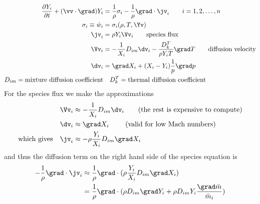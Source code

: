 \documentclass[10pt]{article}
\begin{document}
\begin{align*}
  {\partial Y_i \over \partial t} + (\vv\cdot\grad) Y_i & = {1\over\rho}\sigma_i
              - {1\over\rho}\grad\cdot \jv_i \qquad i=1,2,\ldots,n \\
   \sigma_i \equiv \dot{w}_i &= \sigma_i(\rho,T,\Yv)   \\
      \jv_i & = \rho Y_i \Vv_i \qquad\mbox{species flux} \\
      \Vv_i &= - {1\over X_i} D_{im} \dv_i - {D_k^T\over \rho Y_i T} \grad T \qquad\mbox{diffusion velocity} \\
      \dv_i &= \grad X_i + (X_i-Y_i) {1\over p} \grad p    \\
      D_{im} = \mbox{mixture diffusion coefficient} & \quad D_k^T = \mbox{thermal diffusion coefficient}
\end{align*}
For the species flux we make the approximations
\begin{align*}
  \Vv_i & \approx - {1\over X_i} D_{im} \dv_i  \qquad \mbox{(the rest is expensive to compute)} \\
  \dv_i & \approx \grad X_i        \qquad \mbox{ (valid for low Mach numbers)}           \\
  \mbox{which gives}\quad \jv_i & \approx - \rho {Y_i \over X_i} D_{im}\grad X_i
\end{align*}
and thus the diffusion term on the right hand side of the species equation is
\begin{align*}
-{1\over\rho}\grad\cdot \jv_i &\approx  {1\over\rho}\grad\cdot(\rho {Y_i \over X_i} D_{im}\grad X_i) \\
          &= {1\over\rho}\grad\cdot( \rho D_{im}\grad Y_i + \rho D_{im} Y_i {\grad \mbar \over \mbar_i} )
\end{align*}
\end{document}
